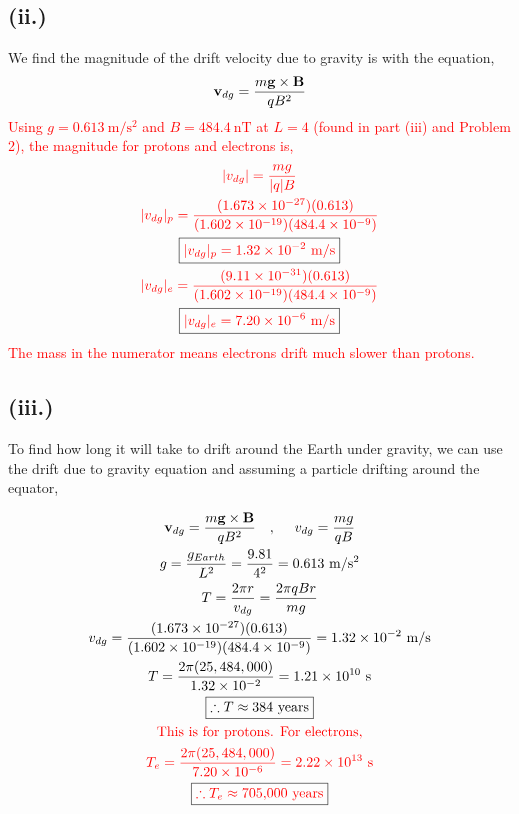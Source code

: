 \documentclass[11pt]{article}
\begin{document}
\subsection*{(ii.)}
\hspace*{2em}We find the magnitude of the drift velocity due to gravity is with the equation,
\begin{gather*}
\bold{v}_{dg} = \frac{m\bold{g}\times \bold{B}}{qB^2}
\end{gather*}
\hspace*{2em}\textcolor{red}{Using $g = 0.613~\mathrm{m/s^2}$ and $B = 484.4~\mathrm{nT}$ at $L=4$ (found in part (iii) and Problem 2), the magnitude for protons and electrons is,}
\begin{gather*}
\textcolor{red}{|v_{dg}| = \frac{mg}{|q|B}} \\
\textcolor{red}{|v_{dg}|_p = \frac{(1.673\times10^{-27})(0.613)}{(1.602\times10^{-19})(484.4\times10^{-9})}} \\
\boxed{\textcolor{red}{|v_{dg}|_p = 1.32\times10^{-2}~\mathrm{m/s}}} \\
\textcolor{red}{|v_{dg}|_e = \frac{(9.11\times10^{-31})(0.613)}{(1.602\times10^{-19})(484.4\times10^{-9})}} \\
\boxed{\textcolor{red}{|v_{dg}|_e = 7.20\times10^{-6}~\mathrm{m/s}}}
\end{gather*}
\hspace*{2em}\textcolor{red}{The mass in the numerator means electrons drift much slower than protons.}
\subsection*{(iii.)}
\hspace*{2em}To find how long it will take to drift around the Earth under gravity, we can use the drift due to gravity equation and assuming a particle drifting around the equator,

\begin{gather*}
\bold{v}_{dg} = \frac{m\bold{g}\times\bold{B}}{qB^2} \quad,~\quad v_{dg} = \frac{mg}{qB} \\
g = \frac{g_{Earth}}{L^2} = \frac{9.81}{4^2} = 0.613~\mathrm{m/s^2} \\
T = \frac{2\pi r}{v_{dg}} = \frac{2\pi qBr}{mg} \\
v_{dg} = \frac{(1.673\times10^{-27})(0.613)}{(1.602\times10^{-19})(484.4\times10^{-9})} = 1.32\times10^{-2}~\mathrm{m/s} \\
T = \frac{2\pi(25,484,000)}{1.32\times10^{-2}} = 1.21\times10^{10}~\mathrm{s} \\
\boxed{\therefore T \approx 384~\mathrm{years}} \\
\textcolor{red}{\text{This is for protons. For electrons,}} \\
\textcolor{red}{T_e = \frac{2\pi(25,484,000)}{7.20\times10^{-6}} = 2.22\times10^{13}~\mathrm{s}} \\
\boxed{\textcolor{red}{\therefore T_e \approx 705{,}000~\mathrm{years}}}
\end{gather*}
\end{document}
